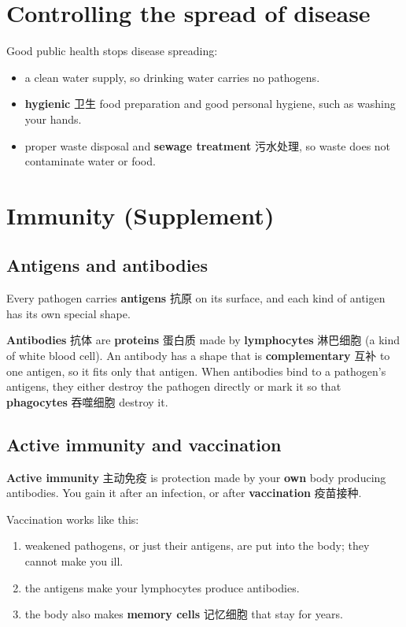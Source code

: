 \documentclass[11pt]{article}
\begin{document}
\section*{Controlling the spread of disease}

Good public health stops disease spreading:

\begin{itemize}
\item a clean water supply, so drinking water carries no pathogens.

\item \textbf{hygienic} 卫生 food preparation and good personal hygiene, such as washing your hands.

\item proper waste disposal and \textbf{sewage treatment} 污水处理, so waste does not contaminate water or food.

\end{itemize}

\section*{Immunity (Supplement)}

\subsection*{Antigens and antibodies}

Every pathogen carries \textbf{antigens} 抗原 on its surface, and each kind of antigen has its own special shape.

\textbf{Antibodies} 抗体 are \textbf{proteins} 蛋白质 made by \textbf{lymphocytes} 淋巴细胞 (a kind of white blood cell). An antibody has a shape that is \textbf{complementary} 互补 to one antigen, so it fits only that antigen. When antibodies bind to a pathogen's antigens, they either destroy the pathogen directly or mark it so that \textbf{phagocytes} 吞噬细胞 destroy it.

\subsection*{Active immunity and vaccination}

\textbf{Active immunity} 主动免疫 is protection made by your \textbf{own} body producing antibodies. You gain it after an infection, or after \textbf{vaccination} 疫苗接种.

Vaccination works like this:

\begin{enumerate}
\item weakened pathogens, or just their antigens, are put into the body; they cannot make you ill.

\item the antigens make your lymphocytes produce antibodies.

\item the body also makes \textbf{memory cells} 记忆细胞 that stay for years.

\end{enumerate}
\end{document}
